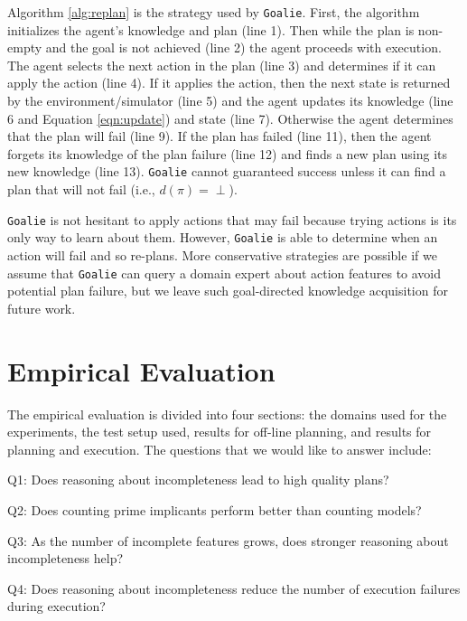 \documentclass[letterpaper]{article}
\newenvironment{packed_itemize}{
\begin{itemize}
  \setlength{\itemsep}{1pt}
  \setlength{\parskip}{0pt}
  \setlength{\parsep}{0pt}
}{\end{itemize}}
\def\goalie{{\tt Goalie}}
\begin{document}
Algorithm \ref{alg:replan} is the strategy used by \goalie{}.  First, the
algorithm  initializes the agent's knowledge and plan (line 1). Then while
the plan is non-empty and the goal is not achieved (line 2) the agent proceeds
with execution.  The agent selects the next action in the plan (line 3) and
determines if it can apply the action (line 4).  If it applies the action, then
the next state is returned by the environment/simulator (line 5) and the agent
updates its knowledge (line 6 and Equation \ref{eqn:update}) and state (line 7).
Otherwise the agent determines that the plan will fail (line 9).  If the plan
has failed (line 11), then the agent forgets its knowledge of the plan failure
(line 12) and finds a new plan using its new knowledge (line 13). \goalie{}
cannot guaranteed success unless it can find a plan that will not fail
(i.e., $d(\pi) = \perp$).

\goalie{} is not hesitant to apply actions that may fail because trying actions
is its only way to learn about them.  However, \goalie{} is able to determine
when an action will fail and so re-plans.  More conservative strategies are
possible if we assume that \goalie{} can query a domain expert about action features
to avoid potential plan failure, but we leave such goal-directed knowledge
acquisition for future work.


\section{Empirical Evaluation}\label{sec:empirical}

The empirical evaluation is divided into four sections:  the domains used for
the experiments, the test setup used, results for off-line planning, and results
for planning and execution.  The questions that we would like to answer
include:
\begin{packed_itemize}
\item Q1: Does reasoning about incompleteness lead to high quality plans?
\item Q2: Does counting prime implicants perform better than counting models?
\item Q3: As the number of incomplete features grows, does stronger reasoning
about incompleteness help?
\item Q4: Does reasoning about incompleteness reduce the number of
execution failures during execution?
\end{packed_itemize}
\end{document}

